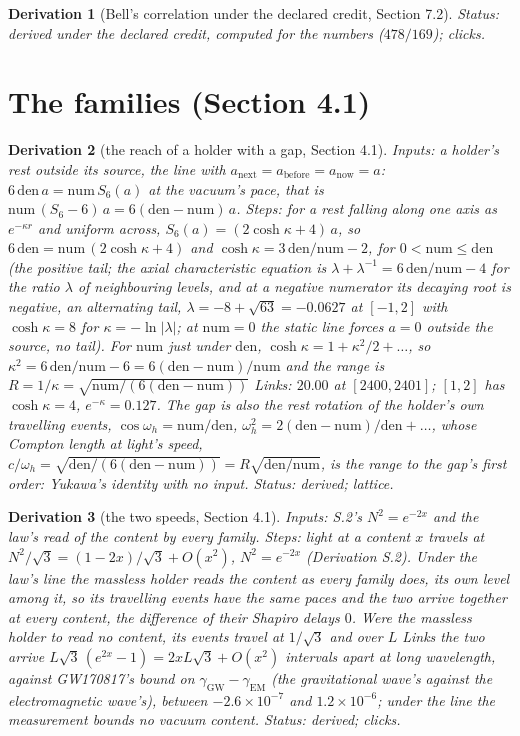 \documentclass[pdflatex,sn-mathphys-num]{sn-jnl}
\newcommand{\num}{\mathrm{num}}
\newcommand{\den}{\mathrm{den}}
\newcommand{\anow}{a_{\mathrm{now}}}
\newcommand{\abefore}{a_{\mathrm{before}}}
\newcommand{\anext}{a_{\mathrm{next}}}
\theoremstyle{thmstyleone}
\newtheorem{derivation}{Derivation}
\begin{document}
\begin{derivation}[Bell's correlation under the declared credit, Section 7.2]
 \emph{Status:} derived under the declared credit, computed for the numbers ($478 / 169$); clicks.
\end{derivation}

\section*{The families (Section 4.1)}

\begin{derivation}[the reach of a holder with a gap, Section 4.1]
\emph{Inputs:} a holder's rest outside its source, the line with $\anext = \abefore = \anow = a$: $6\,\den\,a = \num\,S_6(a)$ at the vacuum's pace, that is $\num\,(S_6 - 6)\,a = 6(\den - \num)\,a$. \emph{Steps:} for a rest falling along one axis as $e^{-\kappa r}$ and uniform across, $S_6(a) = (2\cosh\kappa + 4)\,a$, so $6\,\den = \num\,(2\cosh\kappa + 4)$ and $\cosh\kappa = 3\,\den / \num - 2$, for $0 < \num \le \den$ (the positive tail; the axial characteristic equation is $\lambda + \lambda^{-1} = 6\,\den / \num - 4$ for the ratio $\lambda$ of neighbouring levels, and at a negative numerator its decaying root is negative, an alternating tail, $\lambda = -8 + \sqrt{63} = -0.0627$ at $[-1, 2]$ with $\cosh\kappa = 8$ for $\kappa = -\ln|\lambda|$; at $\num = 0$ the static line forces $a = 0$ outside the source, no tail). For $\num$ just under $\den$, $\cosh\kappa = 1 + \kappa^2 / 2 + \dots$, so $\kappa^2 = 6\,\den / \num - 6 = 6(\den - \num) / \num$ and the range is $R = 1 / \kappa = \sqrt{\num / (6(\den - \num))}$ Links: $20.00$ at $[2400, 2401]$; $[1, 2]$ has $\cosh\kappa = 4$, $e^{-\kappa} = 0.127$. The gap is also the rest rotation of the holder's own travelling events, $\cos\omega_h = \num / \den$, $\omega_h^2 = 2(\den - \num) / \den + \dots$, whose Compton length at light's speed, $c / \omega_h = \sqrt{\den / (6(\den - \num))} = R\sqrt{\den / \num}$, is the range to the gap's first order: Yukawa's identity with no input.
 \emph{Status:} derived; lattice.
\end{derivation}

\begin{derivation}[the two speeds, Section 4.1]
\emph{Inputs:} S.2's $N^2 = e^{-2x}$ and the law's read of the content by every family. \emph{Steps:} light at a content $x$ travels at $N^2 / \sqrt 3 = (1 - 2x) / \sqrt 3 + O(x^2)$, $N^2 = e^{-2x}$ (Derivation S.2). Under the law's line the massless holder reads the content as every family does, its own level among it, so its travelling events have the same paces and the two arrive together at every content, the difference of their Shapiro delays $0$. Were the massless holder to read no content, its events travel at $1 / \sqrt 3$ and over $L$ Links the two arrive $L\sqrt 3\,(e^{2x} - 1) = 2xL\sqrt 3 + O(x^2)$ intervals apart at long wavelength, against GW170817's bound \cite{gw170817} on $\gamma_{\mathrm{GW}} - \gamma_{\mathrm{EM}}$ (the gravitational wave's against the electromagnetic wave's), between $-2.6 \times 10^{-7}$ and $1.2 \times 10^{-6}$; under the line the measurement bounds no vacuum content.
 \emph{Status:} derived; clicks.
\end{derivation}
\end{document}
